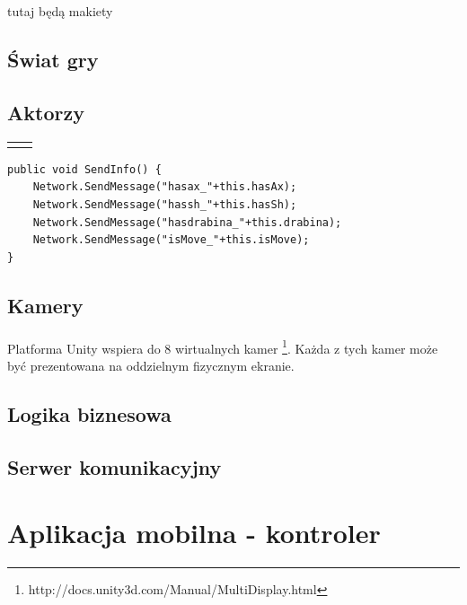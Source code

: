 \documentclass[12pt]{article}
\begin{document}
{{\color{red}tutaj będą makiety}

\subsection{Świat gry}
\subsection{Aktorzy}

\begin{center}

 \begin{tabular}{|c|c|}
 \hline  
  &   \\
  \hline   
  &   \\
  \hline   
\end{tabular}


\end{center}

\begin{lstlisting}[language=CSharp]
public void SendInfo() {
	Network.SendMessage("hasax_"+this.hasAx);
	Network.SendMessage("hassh_"+this.hasSh);
	Network.SendMessage("hasdrabina_"+this.drabina);
	Network.SendMessage("isMove_"+this.isMove);
}
\end{lstlisting}


\subsection{Kamery}
\paragraph{}
Platforma Unity wspiera do 8 wirtualnych kamer \footnote{http://docs.unity3d.com/Manual/MultiDisplay.html}.
Każda z tych kamer może być prezentowana na oddzielnym fizycznym ekranie.


\subsection{Logika biznesowa}
\subsection{Serwer komunikacyjny}
\newpage
\section{Aplikacja mobilna - kontroler}

}
\end{document}
